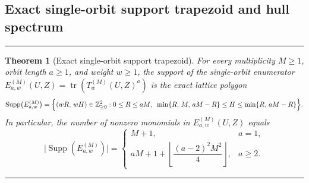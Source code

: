 \documentclass[preprint,12pt]{elsarticle}
\newcommand{\Z}{\mathbb Z}
\newcommand{\tr}{\operatorname{tr}}
\numberwithin{equation}{section}
\theoremstyle{plain}
\newtheorem{theorem}{Theorem}[section]
\theoremstyle{definition}
\theoremstyle{remark}
\newenvironment{keyresult}
  {\par\addvspace{3pt}\noindent\rule{\linewidth}{0.4pt}\par\nobreak\addvspace{3pt}}
  {\par\nobreak\addvspace{3pt}\noindent\rule{\linewidth}{0.4pt}\par\addvspace{3pt}}
\begin{document}
\subsection{Exact single-orbit support trapezoid and hull spectrum}\label{sec:support}

\begin{keyresult}
\begin{theorem}[Exact single-orbit support trapezoid]\label{thm:support-trapezoid}
For every multiplicity $M\ge 1$, orbit length $a\ge 1$, and weight $w\ge 1$, the
support of the single-orbit enumerator $E_{a,w}^{(M)}(U,Z)=\tr(T_w^{(M)}(U,Z)^a)$
is the exact lattice polygon
\begin{equation}\label{eq:support-trapezoid}
\operatorname{Supp}\bigl(E_{a,w}^{(M)}\bigr)
 =\Bigl\{(wR,\,wH)\in\Z_{\ge 0}^2:
    0\le R\le aM,\;\;
    \min\{R,\,M,\,aM-R\}\le H\le\min\{R,\,aM-R\}\Bigr\}.
\end{equation}
In particular, the number of nonzero monomials in $E_{a,w}^{(M)}(U,Z)$ equals
\begin{equation}\label{eq:support-cardinality}
\bigl|\operatorname{Supp}(E_{a,w}^{(M)})\bigr|=
\begin{cases}
M+1, & a=1,\\[4pt]
aM+1+\left\lfloor\dfrac{(a-2)^2 M^2}{4}\right\rfloor, & a\ge 2.
\end{cases}
\end{equation}
\end{theorem}
\end{keyresult}
\end{document}
